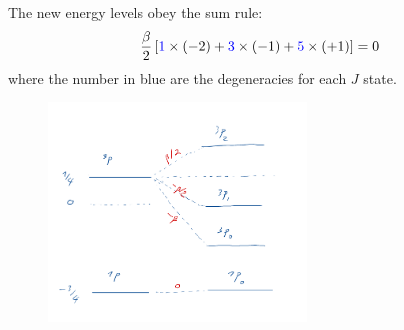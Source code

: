 \documentclass{article}
\theoremstyle{definition}
\newcommand{\be}{\beta}
\newcommand{\f}[2]{\frac{#1}{#2}}
\newcommand{\lb}{\left[}
\newcommand{\rb}{\right]}
\begin{document}
\begin{enumerate}[label=(\alph*)]
	The new energy levels obey the sum rule: 
	\begin{align*}
	\f{\be}{2} \lb \textcolor{blue}{1}\times (-2) + \textcolor{blue}{3} \times (-1) + \textcolor{blue}{5} \times (+1) \rb = 0
	\end{align*}
	where the number in blue are the degeneracies for each $J$ state. 
	
	\begin{figure}[!htb]
		\centering
		\includegraphics[width=0.61\textwidth]{levels_1.png}
	\end{figure}
	
	
	\newpage
	
	
	

\end{enumerate}
\end{document}
